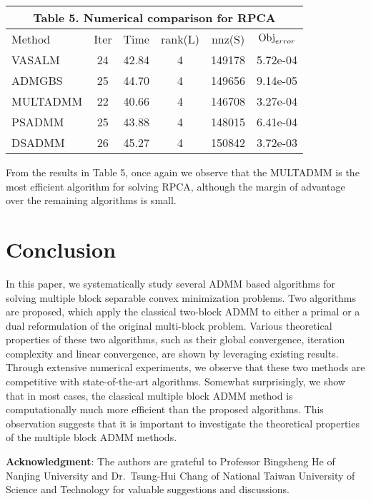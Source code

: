 \documentclass{mcom-l}
\theoremstyle{definition}
\theoremstyle{remark}
\numberwithin{equation}{section}
\begin{document}
\begin{center}
{\scriptsize\vskip 0.1cm
\begin{tabular}{| l || c| c| c| c| c|}
\multicolumn{6}{c}{\small{Table 5. Numerical comparison for RPCA}}\\
\hline
\hbox{Method}&\hbox{Iter}&\hbox{Time}&\hbox{rank(L)}&\hbox{nnz(S)}&$\hbox{Obj}_{error}$\\
\hline
VASALM      &24 &42.84  &  4    & 149178    &5.72e-04\\
\hline
ADMGBS      &25 &44.70  &  4    & 149656    &9.14e-05\\
\hline
MULTADMM    &22 &40.66  &  4    & 146708    &3.27e-04\\
\hline
PSADMM      &25 &43.88  &  4    & 148015    &6.41e-04\\
\hline
DSADMM      &26 &45.27  &  4    & 150842    &3.72e-03\\
\hline
\end{tabular}
}
\end{center}

From the results in Table 5, once again we observe that the MULTADMM is the most efficient algorithm for solving RPCA, although the margin of advantage over the remaining algorithms is small.

\section{Conclusion}\label{secConclusion}

In this paper, we systematically study several ADMM based algorithms for solving multiple block separable convex minimization problems. Two algorithms are proposed, which apply the classical two-block ADMM to either a primal or a dual reformulation of the original multi-block problem. Various theoretical properties of these two algorithms, such as their global convergence, iteration complexity and linear convergence, are shown by leveraging existing results. Through extensive numerical experiments, we observe that these two methods are competitive with state-of-the-art algorithms. Somewhat surprisingly, we show that in most cases, the classical multiple block ADMM method is computationally much more efficient than the proposed algorithms. This observation suggests that it is important to investigate the theoretical properties of the multiple block ADMM methods.

\medskip
{\bf{Acknowledgment}}: The authors are grateful to Professor Bingsheng He of Nanjing University and Dr.\ Tsung-Hui Chang of National Taiwan University of Science and Technology for valuable suggestions and discussions.
\end{document}
